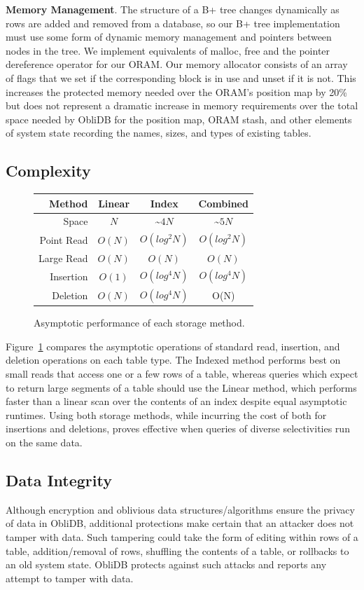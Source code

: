 \documentclass[letterpaper,twocolumn,10pt]{article}
\def\name/{ObliDB}
\begin{document}
\noindent \textbf{Memory Management}. The structure of a B+ tree changes dynamically as rows are added and removed from a database, so our B+ tree implementation must use some form of dynamic memory management and pointers between nodes in the tree. We implement equivalents of malloc, free and the pointer dereference operator for our ORAM. Our memory allocator consists of an array of flags that we set if the corresponding block is in use and unset if it is not. This increases the protected memory needed over the ORAM's position map by 20\% but does not represent a dramatic increase in memory requirements over the total space needed by \name/ for the position map, ORAM stash, and other elements of system state recording the names, sizes, and types of existing tables.

\subsection{Complexity}
\begin{figure}
\small
\center
\begin{tabular}{r|ccc}
Method&Linear&Index&Combined\\\hline
Space &$N$&\textasciitilde$4N$&\textasciitilde$5N$\\
Point Read&$O(N)$&$O(log^2N)$&$O(log^2N)$\\
Large Read&$O(N)$&$O(N)$&$O(N)$\\
Insertion&$O(1)$&$O(log^4N)$&$O(log^4N)$\\
Deletion&$O(N)$&$O(log^4N)$&O(N)\\
\end{tabular}
\caption{\small Asymptotic performance of each storage method.}
\label{asymTables}
\end{figure}
Figure~\ref{asymTables} compares the asymptotic operations of standard read, insertion, and deletion operations on each table type. The Indexed method performs best on small reads that access one or a few rows of a table, whereas queries which expect to return large segments of a table should use the Linear method,  which performs faster than a linear scan over the contents of an index despite equal asymptotic runtimes. Using both storage methods, while incurring the cost of both for insertions and deletions, proves effective when queries of diverse selectivities run on the same data.

\subsection{Data Integrity}
Although encryption and oblivious data structures/algorithms ensure the privacy of data in \name/, additional protections make certain that an attacker does not tamper with data. Such tampering could take the form of editing within rows of a table, addition/removal of rows, shuffling the contents of a table, or rollbacks to an old system state. \name/ protects against such attacks and reports any attempt to tamper with data.
\end{document}
